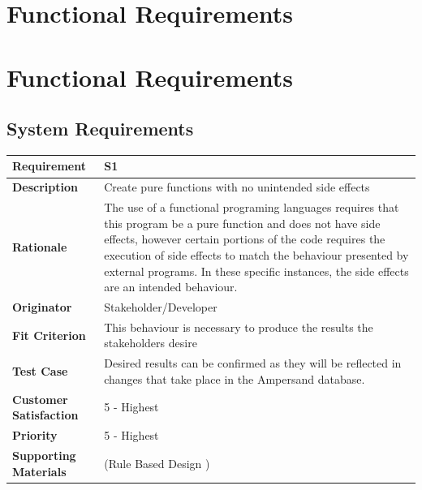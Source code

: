 \documentclass[12pt]{report}
\begin{document}
\section{Functional Requirements}\label{sec:Functional}
\section{Functional Requirements}\label{sec:Functional}

\subsection{System Requirements}
{\setlength{\tabcolsep}{6pt} %
    \begin{tabularx}{\textwidth}{>{\bfseries}m{3cm}X}
        Requirement & S1 \\ 
        \midrule
        \endhead
        Description  & Create pure functions with no unintended side effects
        \\	Rationale & The use of a functional programing languages requires 
        that this program be a pure function and does not have side effects, 
        however certain portions of the code requires the execution of side 
        effects to match the behaviour presented by external programs. In these 
        specific instances, the side effects are an intended behaviour.
        \\	Originator & Stakeholder/Developer
        
        \\	Fit Criterion & This behaviour is necessary to produce the results 
        the stakeholders desire
        \\ Test Case & Desired results can be confirmed as they will be 
        reflected in changes that take place in the Ampersand database.
        \\	Customer Satisfaction & 5 - Highest 
        \\	Priority & 5 - Highest 
        \\	Supporting Materials & (Rule Based Design \cite {RBD})
        \vspace{12pt}
    \end{tabularx}
}
\end{document}
